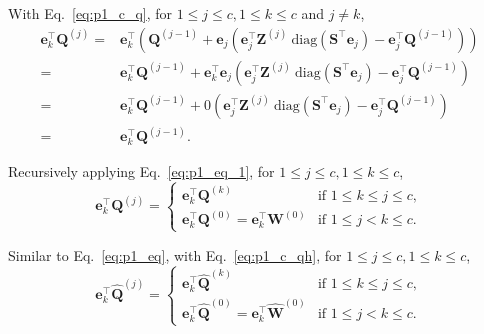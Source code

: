 \documentclass{article} %
\begin{document}
With Eq.~\ref{eq:p1_c_q}, for $1 \le j \le c, 1 \le k \le c$ and $j \ne k$,
\begin{equation}
\begin{aligned}
\mathbf{e}_{k}^\top \bm{Q}^{(j)}
= & \mathbf{e}_{k}^\top \left( \bm{Q}^{(j-1)} + \mathbf{e}_{j} \left( \mathbf{e}_{j}^\top \bm{Z}^{(j)} \mathrm{\ diag} \left( \bm{S}^\top \mathbf{e}_{j} \right) - \mathbf{e}_{j}^\top \bm{Q}^{(j-1)} \right) \right) \\
= & \mathbf{e}_{k}^\top \bm{Q}^{(j-1)} + \mathbf{e}_{k}^\top \mathbf{e}_{j} \left( \mathbf{e}_{j}^\top \bm{Z}^{(j)} \mathrm{\ diag} \left( \bm{S}^\top \mathbf{e}_{j} \right) - \mathbf{e}_{j}^\top \bm{Q}^{(j-1)} \right) \\
= & \mathbf{e}_{k}^\top \bm{Q}^{(j-1)} + 0 \left( \mathbf{e}_{j}^\top \bm{Z}^{(j)} \mathrm{\ diag} \left( \bm{S}^\top \mathbf{e}_{j} \right) - \mathbf{e}_{j}^\top \bm{Q}^{(j-1)} \right) \\
= & \mathbf{e}_{k}^\top \bm{Q}^{(j-1)} .
\end{aligned}
\label{eq:p1_eq_1}
\end{equation}

Recursively applying Eq.~\ref{eq:p1_eq_1}, for $1 \le j \le c, 1 \le k \le c$,
\begin{equation}
\mathbf{e}_{k}^\top \bm{Q}^{(j)}
= \begin{cases}
\mathbf{e}_{k}^\top \bm{Q}^{(k)} & \text{if } 1 \le k \le j \le c ,\\
\mathbf{e}_{k}^\top \bm{Q}^{(0)} = \mathbf{e}_{k}^\top \bm{W}^{(0)}  & \text{if } 1 \le j < k \le c .
\end{cases}
\label{eq:p1_eq}
\end{equation}

Similar to Eq.~\ref{eq:p1_eq}, with Eq.~\ref{eq:p1_c_qh}, for $1 \le j \le c, 1 \le k \le c$,
\begin{equation}
\mathbf{e}_{k}^\top \hat{\bm{Q}}^{(j)}
= \begin{cases}
\mathbf{e}_{k}^\top \hat{\bm{Q}}^{(k)} & \text{if } 1 \le k \le j \le c ,\\
\mathbf{e}_{k}^\top \hat{\bm{Q}}^{(0)} = \mathbf{e}_{k}^\top \hat{\bm{W}}^{(0)}  & \text{if } 1 \le j < k \le c .
\end{cases}
\label{eq:p1_eqh}
\end{equation}
\end{document}
